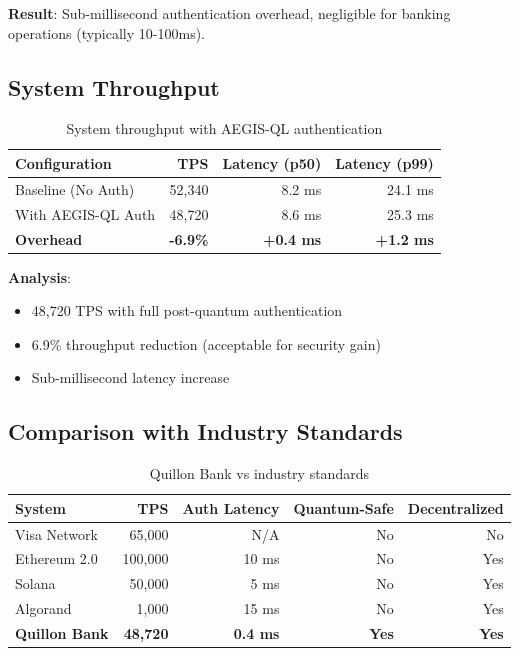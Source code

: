 \documentclass[11pt,a4paper]{article}
\begin{document}
\textbf{Result}: Sub-millisecond authentication overhead, negligible for banking operations (typically 10-100ms).

\subsection{System Throughput}

\begin{table}[h]
\centering
\begin{tabular}{@{}lrrr@{}}
\toprule
\textbf{Configuration} & \textbf{TPS} & \textbf{Latency (p50)} & \textbf{Latency (p99)} \\ \midrule
Baseline (No Auth) & 52,340 & 8.2 ms & 24.1 ms \\
With AEGIS-QL Auth & 48,720 & 8.6 ms & 25.3 ms \\
\textbf{Overhead} & \textbf{-6.9\%} & \textbf{+0.4 ms} & \textbf{+1.2 ms} \\ \bottomrule
\end{tabular}
\caption{System throughput with AEGIS-QL authentication}
\label{tab:throughput}
\end{table}

\textbf{Analysis}:
\begin{itemize}
    \item 48,720 TPS with full post-quantum authentication
    \item 6.9\% throughput reduction (acceptable for security gain)
    \item Sub-millisecond latency increase
\end{itemize}

\subsection{Comparison with Industry Standards}

\begin{table}[h]
\centering
\small
\begin{tabular}{@{}lrrrr@{}}
\toprule
\textbf{System} & \textbf{TPS} & \textbf{Auth Latency} & \textbf{Quantum-Safe} & \textbf{Decentralized} \\ \midrule
Visa Network & 65,000 & N/A & No & No \\
Ethereum 2.0 & 100,000 & ~10 ms & No & Yes \\
Solana & 50,000 & ~5 ms & No & Yes \\
Algorand & 1,000 & ~15 ms & No & Yes \\ \midrule
\textbf{Quillon Bank} & \textbf{48,720} & \textbf{0.4 ms} & \textbf{Yes} & \textbf{Yes} \\ \bottomrule
\end{tabular}
\caption{Quillon Bank vs industry standards}
\label{tab:industry_comparison}
\end{table}
\end{document}
